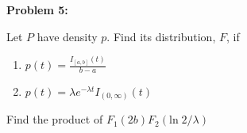 \textbf{Problem 5:}

\singlespacing

Let $P$ have density $p$. Find its distribution, $F$, if

\begin{enumerate}
    \item $p(t) = \frac{I_{[a,b]}(t)}{b-a}$
    \item $p(t) = \lambda e^{-\lambda t}I_{(0,\infty)}(t)$
\end{enumerate}

Find the product of $F_1(2b)F_2(\text{ln}\; 2/\lambda)$